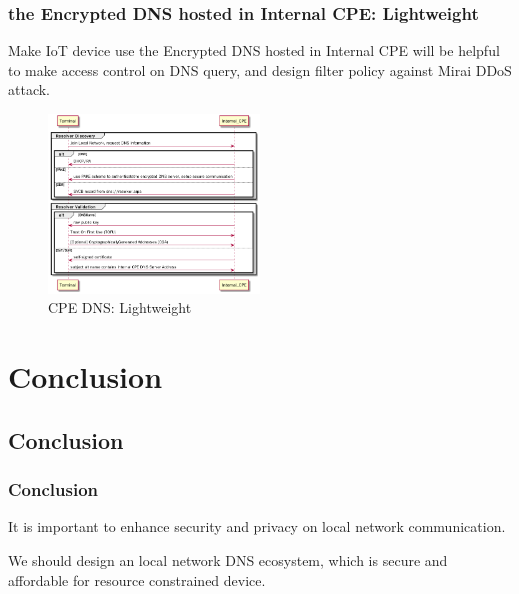 \documentclass{ctexbeamer}
\begin{document}
\begin{frame}
    \frametitle{the Encrypted DNS hosted in Internal CPE: Lightweight}

    Make IoT device use the Encrypted DNS hosted in Internal CPE will be helpful to make access control on DNS query, and design filter policy against Mirai DDoS attack.

    \begin{figure}[H]
        \centering 
        \includegraphics[width=0.5\textwidth]{pic/lightweight.png} 
        \caption{CPE DNS: Lightweight} 
        \label{fig.lightweight}
    \end{figure}

\end{frame}

\section{Conclusion}

\subsection{Conclusion}

\begin{frame}
    \frametitle{Conclusion}
It is important to enhance security and privacy on local network communication.

We should design an local network DNS ecosystem, which is secure and affordable for resource constrained device.
    \end{frame}
\end{document}
